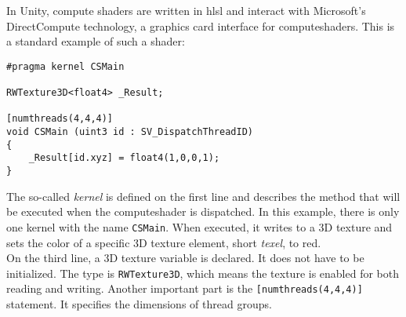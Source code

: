 \begin{figure}[H]
    \label{img:tikz:compute:architecture}
\end{figure}

\noindent
In Unity, compute shaders are written in \gls{hlsl} and interact with Microsoft's DirectCompute technology, a graphics card interface for \gls{computeshader}s.
This is a standard example of such a \gls{shader}:

\begin{lstlisting}[language=HLSL, caption=A standard \gls{computeshader} template., label=lst:shader:compute:standard]
#pragma kernel CSMain

RWTexture3D<float4> _Result;

[numthreads(4,4,4)]
void CSMain (uint3 id : SV_DispatchThreadID)
{
    _Result[id.xyz] = float4(1,0,0,1);
}
\end{lstlisting}

\noindent
The so-called \emph{\gls{kernel}} is defined on the first line and describes the method that will be executed when the \gls{computeshader} is dispatched.
In this example, there is only one \gls{kernel} with the name \lstinline[language=HLSL]{CSMain}.
When executed, it writes to a 3D texture and sets the color of a specific 3D texture element, short \emph{\gls{texel}}, to red.
\\
On the third line, a 3D texture variable is declared.
It does not have to be initialized.
The type is \lstinline[language=HLSL]{RWTexture3D}, which means the texture is enabled for both reading and writing.
Another important part is the \lstinline[language=HLSL]{[numthreads(4,4,4)]} statement. It specifies the dimensions of thread groups.

